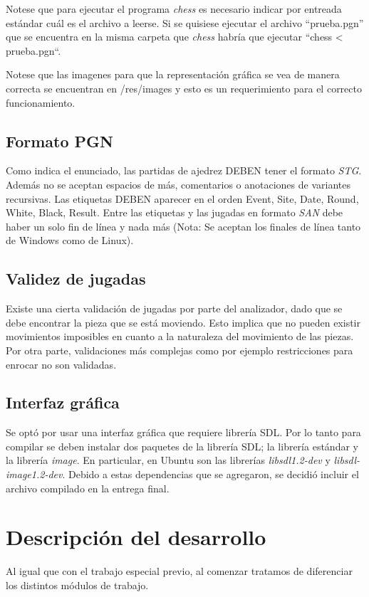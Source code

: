 \documentclass[a4paper,10pt]{article}
\begin{document}
Notese que para ejecutar el programa \textit{chess} es necesario indicar por entreada estándar cuál es el archivo a leerse. Si se 
quisiese ejecutar el archivo ``prueba.pgn'' que se encuentra en la misma carpeta que \textit{chess} habría que ejecutar ``chess < 
prueba.pgn``.

Notese que las imagenes para que la representación gráfica se vea de manera correcta se encuentran en /res/images y esto es un 
requerimiento para el correcto funcionamiento.

\subsection{Formato PGN}

Como indica el enunciado, las partidas de ajedrez DEBEN tener el formato \textit{STG}. Además no se aceptan espacios de más, comentarios 
o anotaciones de variantes recursivas. Las etiquetas DEBEN aparecer en el orden Event, Site, Date, Round, White, Black, Result.
 Entre las etiquetas y las jugadas en formato \textit{SAN} debe haber un solo fin de línea y nada más (Nota: Se aceptan los finales de línea 
tanto de Windows como de Linux).

\subsection{ Validez de jugadas}

Existe una cierta validación de jugadas por parte del analizador, dado que se debe encontrar la pieza que se está moviendo. Esto implica que 
no pueden existir movimientos imposibles en cuanto a la naturaleza del movimiento de las piezas. Por otra parte, validaciones más complejas como 
por ejemplo restricciones para enrocar no son validadas.

\subsection{ Interfaz gráfica}

Se optó por usar una interfaz gráfica que requiere librería SDL. Por lo tanto para compilar se deben instalar dos paquetes de la librería SDL; la librería 
estándar y la librería \textit{image}. En particular, en Ubuntu son las librerías \textit{libsdl1.2-dev} y \textit{libsdl-image1.2-dev}. Debido a estas 
dependencias que se agregaron, se decidió incluir el archivo compilado en la entrega final.

\newpage

\section{Descripción del desarrollo}
  Al igual que con el trabajo especial previo, al comenzar tratamos de diferenciar los distintos módulos de trabajo. 
\end{document}
